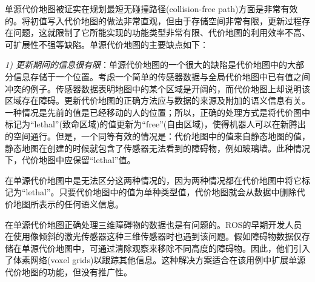 单源代价地图被证实在规划最短无碰撞路径(collision-free path)方面是非常有效的。将初值写入代价地图的做法非常直观，但由于存储空间非常有限，更新过程存在问题，这就限制了它所能实现的功能类型非常有限、代价地图的利用效率不高、可扩展性不强等缺陷。单源代价地图的主要缺点如下：

\emph{\color{blue}1) 更新期间的信息很有限}：单源代价地图的一个很大的缺陷是代价地图中的大部分信息存储于一个位置。考虑一个简单的传感器数据与全局代价地图中已有值之间冲突的例子。传感器数据表明地图中的某个区域是开阔的，而代价地图上却说明该区域存在障碍。更新代价地图的正确方法应与数据的来源及附加的语义信息有关。一种情况是先前的值是已经移动的人的位置；所以，正确的处理方式是将代价图中标记为“lethal”(致命区域)的值更新为“free”(自由区域)，使得机器人可以在新腾出的空间通行。但是，一个同等有效的情况是：代价地图中的值来自静态地图的值，静态地图在创建的时候就包含了传感器无法看到的障碍物，例如玻璃墙。此种情况下，代价地图中应保留“lethal”值。

在单源代价地图中是无法区分这两种情况的，因为两种情况都在代价地图中将它标记为“lethal”。只要代价地图中的值为单种类型值，代价地图就会从数据中删除代价地图所表示的任何语义信息。


在单源代价地图正确处理三维障碍物的数据也是有问题的。ROS的早期开发人员在使用像倾斜的激光传感器这种三维传感器时也遇到该问题。假如障碍物数据仅存储在单源代价地图中，可通过清除观察来移除不同高度的障碍物。因此，他们引入了体素网络(voxel grids)以跟踪其他信息\cite{marder2010office}。这种解决方案适合在该用例中扩展单源代价地图的功能，但没有推广性。



